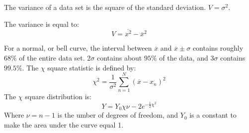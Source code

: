 \documentclass[crop=false,class=book,oneside]{standalone}                      %
\begin{document}
        \begin{definition}
            The variance of a data set is the square of the
            standard deviation. $V=\sigma^{2}$.
        \end{definition}
        \begin{theorem}
            The variance is equal to:
            \begin{equation*}
                V=\overline{x^{2}}-\overline{x}^{2}
            \end{equation*}
        \end{theorem}
        For a normal, or bell curve, the interval between
        $\overline{x}$ and $\overline{x}\pm\sigma$ contains
        roughly $68\%$ of the entire data set. $2\sigma$
        contains about $95\%$ of the data, and
        $3\sigma$ contains $99.5\%$.
        The $\chi$ square statistic is defined by:
        \begin{equation*}
            \chi^{2}=\frac{1}{\sigma^{2}}
                \sum_{n=1}^{N}(\overline{x}-x_{n})^{2}
        \end{equation*}
        The $\chi$ square distribution is:
        \begin{equation*}
            Y=Y_{0}\chi{\nu-2}e^{-\frac{1}{2}\chi^{2}}
        \end{equation*}
        Where $\nu=n-1$ is the umber of degrees of freedom,
        and $Y_{0}$ is a constant to make the area under the
        curve equal 1.
\end{document}
